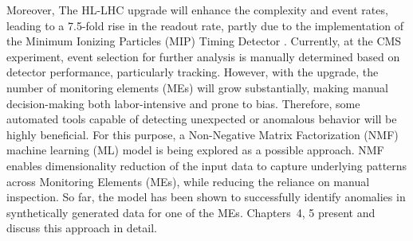 Moreover, The HL-LHC upgrade will enhance the complexity and event rates, leading to a 7.5-fold rise in the readout rate, partly due to the implementation of the Minimum Ionizing Particles (MIP) Timing Detector \cite{Fernandez_Perez_Tomei_2020}. Currently, at the CMS experiment, event selection for further analysis is manually determined based on detector performance, particularly tracking. However, with the upgrade, the number of monitoring elements (MEs) will grow substantially, making manual decision-making both labor-intensive and prone to bias. Therefore, some automated tools capable of detecting unexpected or anomalous behavior will be highly beneficial. For this purpose, a Non-Negative Matrix Factorization (NMF) machine learning (ML) model is being explored as a possible approach. NMF enables dimensionality reduction of the input data to capture underlying patterns across Monitoring Elements (MEs), while reducing the reliance on manual inspection. So far, the model has been shown to successfully identify anomalies in synthetically generated data for one of the MEs. Chapters~4, 5 present and discuss this approach in detail.
